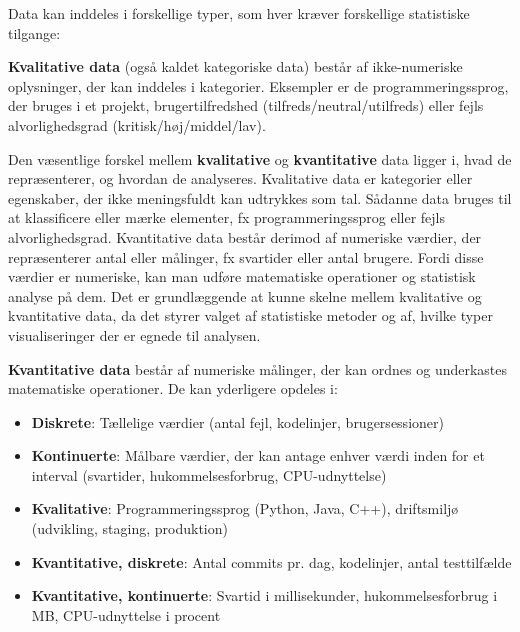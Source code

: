 Data kan inddeles i forskellige typer, som hver kræver forskellige statistiske tilgange:

\begin{definition}
\textbf{Kvalitative data} (også kaldet kategoriske data) består af ikke-numeriske oplysninger, der kan inddeles i kategorier. Eksempler er de programmeringssprog, der bruges i et projekt, brugertilfredshed (tilfreds/neutral/utilfreds) eller fejls alvorlighedsgrad (kritisk/høj/middel/lav).
\end{definition}

Den væsentlige forskel mellem \textbf{kvalitative} og \textbf{kvantitative} data ligger i, hvad de repræsenterer, og hvordan de analyseres. Kvalitative data er kategorier eller egenskaber, der ikke meningsfuldt kan udtrykkes som tal. Sådanne data bruges til at klassificere eller mærke elementer, fx programmeringssprog eller fejls alvorlighedsgrad. Kvantitative data består derimod af numeriske værdier, der repræsenterer antal eller målinger, fx svartider eller antal brugere. Fordi disse værdier er numeriske, kan man udføre matematiske operationer og statistisk analyse på dem. Det er grundlæggende at kunne skelne mellem kvalitative og kvantitative data, da det styrer valget af statistiske metoder og af, hvilke typer visualiseringer der er egnede til analysen.

\begin{definition}
\textbf{Kvantitative data} består af numeriske målinger, der kan ordnes og underkastes matematiske operationer. De kan yderligere opdeles i:
\begin{itemize}
    \item \textbf{Diskrete}: Tællelige værdier (antal fejl, kodelinjer, brugersessioner)
    \item \textbf{Kontinuerte}: Målbare værdier, der kan antage enhver værdi inden for et interval (svartider, hukommelsesforbrug, CPU-udnyttelse)
\end{itemize}
\end{definition}

\begin{example}
\begin{itemize}
    \item \textbf{Kvalitative}: Programmeringssprog (Python, Java, C++), driftsmiljø (udvikling, staging, produktion)
    \item \textbf{Kvantitative, diskrete}: Antal commits pr. dag, kodelinjer, antal testtilfælde
    \item \textbf{Kvantitative, kontinuerte}: Svartid i millisekunder, hukommelsesforbrug i MB, CPU-udnyttelse i procent
\end{itemize}
\end{example}

